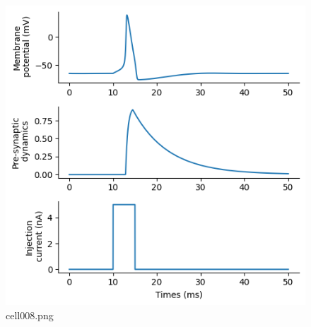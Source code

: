 \begin{figure}[ht]
	\centering
	\includegraphics[scale=0.8, max width=\linewidth]{./fig/synapse-model/kinetic-synapse/cell008.png}
	\caption{cell008.png}
	\label{cell008.png}
\end{figure}